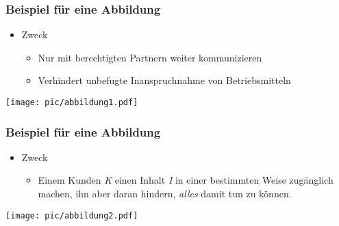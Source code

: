 \documentclass[t, xcolor=dvipsnames]{beamer}
\begin{document}
\begin{frame}
	\frametitle{Beispiel für eine Abbildung}
	\begin{itemize}
		\item Zweck
			\begin{itemize}
				\item Nur mit \alert{berechtigten Partnern} weiter kommunizieren
				\item Verhindert unbefugte Inanspruchnahme von Betriebsmitteln
			\end{itemize}
	\end{itemize}
	\vspace{\fill}
	\pause %
	\begin{center}
		\texttt{[image: pic/abbildung1.pdf]}
	\end{center}
\end{frame}



\begin{frame}
	\transwipe %
	\frametitle{Beispiel für eine Abbildung}
	\begin{itemize}
		\item Zweck
			\begin{itemize}
				\item Einem Kunden \emph{\color[RGB]{0,128,0} K} einen Inhalt \emph{\color{red} I} in einer bestimmten Weise zugänglich machen, ihn aber daran hindern, \emph{alles} damit tun zu können.
			\end{itemize}
	\end{itemize}
	\vspace{\fill}
	\begin{center}
		\texttt{[image: pic/abbildung2.pdf]}
	\end{center}
\end{frame}
\end{document}
